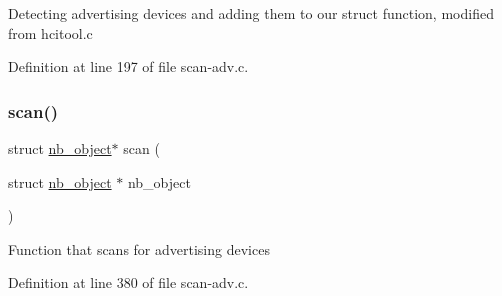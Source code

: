Detecting advertising devices and adding them to our struct function, modified from hcitool.\+c 

Definition at line 197 of file scan-\/adv.\+c.

\mbox{\label{scan-adv_8c_aa17a71c99b4021aa3c3ece883425bb24}} 
\subsubsection{\texorpdfstring{scan()}{scan()}}
{\footnotesize\ttfamily struct \mbox{\hyperlink{structnb__object}{nb\+\_\+object}}$\ast$ scan (\begin{DoxyParamCaption}\item[{struct \mbox{\hyperlink{structnb__object}{nb\+\_\+object}} $\ast$}]{nb\+\_\+object }\end{DoxyParamCaption})}

Function that scans for advertising devices 

Definition at line 380 of file scan-\/adv.\+c.

